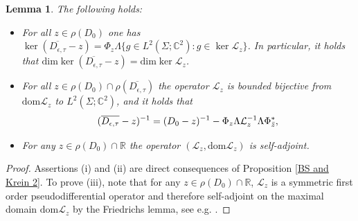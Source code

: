 \documentclass[11pt,a4paper,reqno,oneside]{amsproc}
\DeclareMathOperator{\dom}{dom}
\def \rr {{\mathbb R}}
\def \cc {{\mathbb C}}
\numberwithin{equation}{section}
\def\dom{\mathrm{dom}}
\def \cc {{\mathbb{C}}}
\newtheorem{lemma}[definition]{Lemma}
\begin{document}
\begin{lemma}\label{L BS} The following holds: 
\begin{itemize}
\item[(i)] For all $z\in\rho(D_0)$ one has $\ker (\overline{D_{\epsilon,\tau}}-z)=\Phi_z\Lambda\{ g\in L^2(\Sigma;\cc^2): g\in\ker \mathcal L_z\}$. In particular, it holds that $\mathrm{dim}\ker (\overline{D_{\epsilon,\tau}}-z)=\mathrm{dim}\ker \mathcal L_z$.
\item[(ii)] For all $z\in\rho(D_0)\cap\rho(\overline{D_{\epsilon,\tau}})$ the operator $\mathcal L_z $ is bounded bijective from  $\dom \mathcal L_z$ to $L^2(\Sigma;\cc^2)$,  and it holds that 
\begin{equation}\label{Krein3}
				(\overline{D_{\epsilon, \tau}} - z)^{-1} = (D_0 - z)^{-1} - \Phi_{z} \Lambda\mathcal L_{z}^{-1} \Lambda \Phi_{\Bar{z}}^*,
\end{equation}
\item[(iii)] For any $z\in\rho(D_0)\cap\rr$ the operator $(\mathcal L_z ,\dom \mathcal L_z)$ is self-adjoint.	
\end{itemize}
\end{lemma}
\begin{proof} Assertions (i) and (ii) are  direct consequences of Proposition \ref{BS and Krein 2}. To prove (iii),  note that for any $z\in\rho(D_0)\cap\rr$,  $\mathcal L_z$ is a symmetric first order pseudodifferential operator and therefore self-adjoint on the maximal domain $\dom \mathcal L_z$ by the Friedrichs lemma, see e.g. \cite[Proposition.~7.4]{T2}.
\end{proof}
\end{document}
